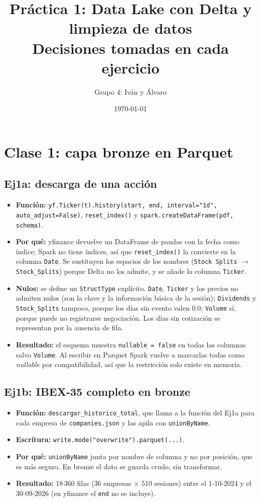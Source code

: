 \documentclass[11pt,a4paper]{article}
\title{Práctica 1: Data Lake con Delta y limpieza de datos\\
\large Decisiones tomadas en cada ejercicio}
\author{Grupo 4: Iván y Álvaro}
\date{\today}
\newcommand{\code}[1]{\texttt{#1}}
\begin{document}
\maketitle

\section*{Clase 1: capa bronze en Parquet}

\subsection*{Ej1a: descarga de una acción}
\begin{itemize}
    \item \textbf{Función:} \code{yf.Ticker(t).history(start, end, interval="1d", auto\_adjust=False)}, \code{reset\_index()} y \code{spark.createDataFrame(pdf, schema)}.
    \item \textbf{Por qué:} yfinance devuelve un DataFrame de pandas con la fecha como índice; Spark no tiene índices, así que \code{reset\_index()} la convierte en la columna \code{Date}. Se sustituyen los espacios de los nombres (\code{Stock Splits} $\rightarrow$ \code{Stock\_Splits}) porque Delta no los admite, y se añade la columna \code{Ticker}.
    \item \textbf{Nulos:} se define un \code{StructType} explícito. \code{Date}, \code{Ticker} y los precios no admiten nulos (son la clave y la información básica de la sesión); \code{Dividends} y \code{Stock\_Splits} tampoco, porque los días sin evento valen 0.0; \code{Volume} sí, porque puede no registrarse negociación. Los días sin cotización se representan por la ausencia de fila.
    \item \textbf{Resultado:} el esquema muestra \code{nullable = false} en todas las columnas salvo \code{Volume}. Al escribir en Parquet Spark vuelve a marcarlas todas como \textit{nullable} por compatibilidad, así que la restricción solo existe en memoria.
\end{itemize}

\subsection*{Ej1b: IBEX-35 completo en bronze}
\begin{itemize}
    \item \textbf{Función:} \code{descargar\_historico\_total}, que llama a la función del Ej1a para cada empresa de \code{companies.json} y las apila con \code{unionByName}.
    \item \textbf{Escritura:} \code{write.mode("overwrite").parquet(...)}.
    \item \textbf{Por qué:} \code{unionByName} junta por nombre de columna y no por posición, que es más seguro. En bronze el dato se guarda crudo, sin transformar.
    \item \textbf{Resultado:} 18\,360 filas (36 empresas $\times$ 510 sesiones) entre el 1-10-2024 y el 30-09-2026 (en yfinance el \code{end} no se incluye).
\end{itemize}
\end{document}
